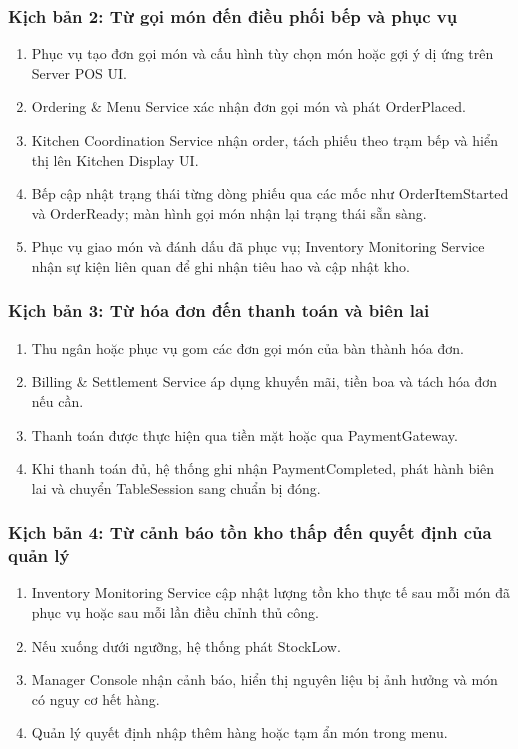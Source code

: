 \subsubsection{Kịch bản 2: Từ gọi món đến điều phối bếp và phục vụ}
\begin{enumerate}
  \item Phục vụ tạo đơn gọi món và cấu hình tùy chọn món hoặc gợi ý dị ứng trên \textsf{Server POS UI}.
  \item \textsf{Ordering \& Menu Service} xác nhận đơn gọi món và phát \textsf{OrderPlaced}.
  \item \textsf{Kitchen Coordination Service} nhận order, tách phiếu theo trạm bếp và hiển thị lên \textsf{Kitchen Display UI}.
  \item Bếp cập nhật trạng thái từng dòng phiếu qua các mốc như \textsf{OrderItemStarted} và \textsf{OrderReady}; màn hình gọi món nhận lại trạng thái sẵn sàng.
  \item Phục vụ giao món và đánh dấu đã phục vụ; \textsf{Inventory Monitoring Service} nhận sự kiện liên quan để ghi nhận tiêu hao và cập nhật kho.
\end{enumerate}

\subsubsection{Kịch bản 3: Từ hóa đơn đến thanh toán và biên lai}
\begin{enumerate}
  \item Thu ngân hoặc phục vụ gom các đơn gọi món của bàn thành hóa đơn.
  \item \textsf{Billing \& Settlement Service} áp dụng khuyến mãi, tiền boa và tách hóa đơn nếu cần.
  \item Thanh toán được thực hiện qua tiền mặt hoặc qua \textsf{PaymentGateway}.
  \item Khi thanh toán đủ, hệ thống ghi nhận \textsf{PaymentCompleted}, phát hành biên lai và chuyển \textsf{TableSession} sang chuẩn bị đóng.
\end{enumerate}

\subsubsection{Kịch bản 4: Từ cảnh báo tồn kho thấp đến quyết định của quản lý}
\begin{enumerate}
  \item \textsf{Inventory Monitoring Service} cập nhật lượng tồn kho thực tế sau mỗi món đã phục vụ hoặc sau mỗi lần điều chỉnh thủ công.
  \item Nếu xuống dưới ngưỡng, hệ thống phát \textsf{StockLow}.
  \item \textsf{Manager Console} nhận cảnh báo, hiển thị nguyên liệu bị ảnh hưởng và món có nguy cơ hết hàng.
  \item Quản lý quyết định nhập thêm hàng hoặc tạm ẩn món trong menu.
\end{enumerate}




